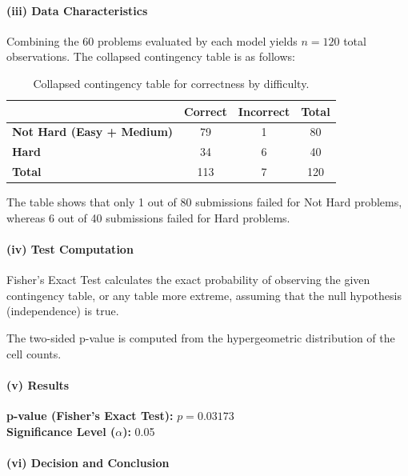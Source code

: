 \documentclass[11pt,a4paper]{article}
\begin{document}
    \paragraph{(iii) Data Characteristics}
    \quad

    Combining the 60 problems evaluated by each model yields $n = 120$ total observations. The collapsed contingency table is as follows:

    \begin{table}[htbp]
    \centering
    \begin{tabular}{lccc}
    \hline
     & \textbf{Correct} & \textbf{Incorrect} & \textbf{Total} \\
    \hline
    \textbf{Not Hard (Easy + Medium)} & 79 & 1  & 80 \\
    \textbf{Hard}                     & 34 & 6  & 40 \\
    \hline
    \textbf{Total}                    & 113 & 7 & 120 \\
    \hline
    \end{tabular}
    \caption{Collapsed contingency table for correctness by difficulty.}
    \label{tab:contingency-difficulty}
    \end{table}

    The table shows that only 1 out of 80 submissions failed for Not Hard problems, whereas 6 out of 40 submissions failed for Hard problems.

    \paragraph{(iv) Test Computation}
    \quad

    Fisher's Exact Test calculates the exact probability of observing the given contingency table, or any table more extreme, assuming that the null hypothesis (independence) is true. 

    The two-sided p-value is computed from the hypergeometric distribution of the cell counts.

    \paragraph{(v) Results}
    \quad

    \textbf{p-value (Fisher's Exact Test):} $p = 0.03173$ \\
    \textbf{Significance Level ($\alpha$):} 0.05 

    \paragraph{(vi) Decision and Conclusion}
    \quad
\end{document}
